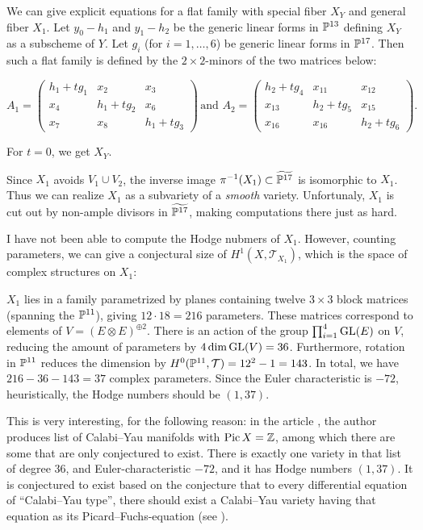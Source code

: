 \begin{remark}
We can give explicit equations for a flat family with special fiber $X_Y$ and general fiber $X_1$. Let $y_0-h_1$ and $y_1-h_2$ be the generic linear forms in $\P^{13}$ defining $X_Y$ as a subscheme of $Y$. Let $g_i$ (for $i=1,\ldots,6$) be generic linear forms in $\P^{17}$. Then such a flat family is defined by the $2 \times 2$-minors of the two matrices below:

\[
A_1 = \begin{pmatrix}
h_1 + tg_1  & x_2 & x_3 \\
x_4 & h_1+tg_2  & x_6 \\
x_7 & x_8 & h_1+tg_3 
\end{pmatrix}\,
\text{and }
A_2 = \begin{pmatrix}
h_2+tg_4 & x_{11} & x_{12} \\
x_{13} & h_2+tg_5 & x_{15} \\
x_{16} & x_{16} & h_2+tg_6
\end{pmatrix}.
\]

For $t=0$, we get $X_Y$.
\end{remark}

\begin{remark}
Since $X_1$ avoids $V_1 \cup V_2$, the inverse image $\pi^{-1}(X_1) \subset \widetilde{\P^{17}}$ is isomorphic to $X_1$. Thus we can realize $X_1$ as a subvariety of a \emph{smooth} variety. Unfortunaly, $X_1$ is cut out by non-ample divisors in $\widetilde{\P^{17}}$, making computations there just as hard.
\end{remark}

\begin{remark}
I have not been able to compute the Hodge nubmers of $X_1$. However, counting parameters, we can give a conjectural size of $H^1(X,\mathcal T_{X_1})$, which is the space of complex structures on $X_1$:

$X_1$ lies in a family parametrized by planes containing twelve $3 \times 3$ block matrices (spanning the $\P^{11}$), giving $12 \cdot 18=216$ parameters. These matrices correspond to elements of $V=(E \otimes E)^{\oplus 2}$. There is an action of the group $\prod_{i=1}^4 \GL(E)$ on $V$, reducing the amount of parameters by $4 \dim \GL(V)=36$. Furthermore, rotation in $\P^{11}$ reduces the dimension by $H^0(\P^{11},\mathcal T)=12^2-1=143$. In total, we have $216-36-143=37$ complex parameters. Since the Euler characteristic is $-72$, heuristically, the Hodge numbers should be $(1,37)$.

This is very interesting, for the following reason: in the article \cite{kapustka_delpezzo}, the author produces list of Calabi--Yau manifolds with $\Pic X = \Z$, among which there are some that are only conjectured to exist. There is exactly one variety in that list of degree $36$, and Euler-characteristic $-72$, and it has Hodge numbers $(1,37)$. It is conjectured to exist based on the conjecture that to every differential equation of ``Calabi--Yau type'', there should exist a Calabi--Yau variety having that equation as its Picard--Fuchs-equation (see \cite{monodromy_straten}).
\end{remark}


